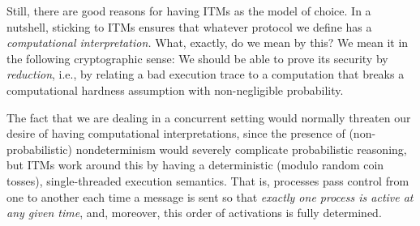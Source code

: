 Still, there are good reasons for having ITMs as the model of choice. In a
nutshell, sticking to ITMs ensures that whatever protocol we define has a
\emph{computational interpretation.} What, exactly, do we mean by this? We mean
it in the following cryptographic sense: We should be able to prove its security
by \emph{reduction}, i.e., by relating a bad execution trace to a computation
that breaks a computational hardness assumption with non-negligible probability.

The fact that we are dealing in a concurrent setting would normally threaten our
desire of having computational interpretations, since the presence of
(non-probabilistic) nondeterminism would severely complicate probabilistic
reasoning, but ITMs work around this by having a deterministic (modulo random
coin tosses), single-threaded execution semantics. That is, processes pass
control from one to another each time a message is sent so that \emph{exactly
  one process is active at any given time}, and, moreover, this order of
activations is fully determined.



